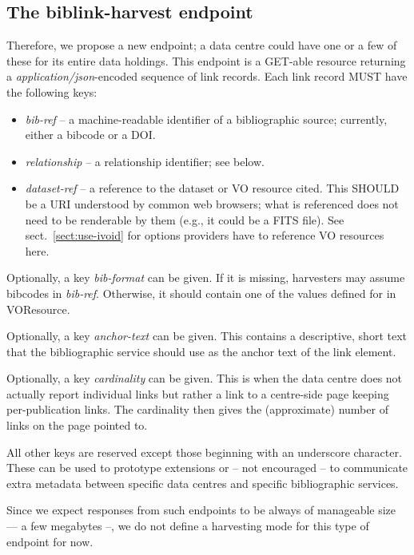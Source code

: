 \documentclass[11pt,a4paper]{ivoa}
\begin{document}
\subsection{The biblink-harvest endpoint}

Therefore, we propose a new endpoint; a data centre could have one or a
few of these for its entire data holdings.  This endpoint is a GET-able
resource returning a \textit{application/json}-encoded sequence of link
records.  Each link record MUST have the following keys:

\begin{itemize}
\item \textit{bib-ref} -- a machine-readable identifier of a bibliographic
source; currently, either a bibcode or a DOI.
\item \textit{relationship} -- a relationship identifier; see below.
\item \textit{dataset-ref} -- a reference to the dataset or VO resource cited.
This SHOULD be a URI understood by common web browsers; what is referenced
does not need to be renderable by them (e.g., it could be a FITS file).
See sect.~\ref{sect:use-ivoid} for options providers have to reference
VO resources here.
\end{itemize}

Optionally, a key \textit{bib-format} can be given.  If it is missing,
harvesters may assume bibcodes in \textit{bib-ref}.  Otherwise, it should
contain one of the values defined for  in
VOResource.

Optionally, a key \textit{anchor-text} can be given.  This contains a
descriptive, short text that the bibliographic service should use as
the anchor text of the link element.

Optionally, a key \textit{cardinality} can be given.  This is when the
data centre does not actually report individual links but rather a link
to a centre-side page keeping per-publication links.  The cardinality
then gives the (approximate) number of links on the page pointed to.

All other keys are reserved except those beginning with an underscore
character.  These can be used to prototype extensions or -- not
encouraged -- to communicate extra metadata between specific data
centres and specific bibliographic services.

Since we expect responses from such endpoints to be always of manageable
size –– a few megabytes --, we do not define a harvesting mode for this
type of endpoint for now.
\end{document}
